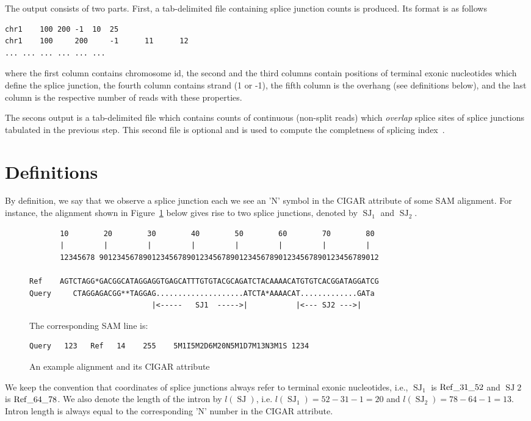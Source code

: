 \documentclass{article}
\DeclareMathOperator{\SJ}{SJ}
\begin{document}
The output consists of two parts. First, a tab-delimited file containing splice junction counts is produced.
Its format is as follows
\begin{verbatim}
chr1    100	200	-1	10	25
chr1    100     200     -1      11      12
...	...	...	...	...	...
\end{verbatim}
where the first column contains chromosome id, the second and the third columns contain positions of terminal exonic 
nucleotides which define the splice junction, the fourth column contains strand (1 or -1), the fifth column is the 
overhang (see definitions below), and the last column is the respective number of reads with these properties.

The secons output is a tab-delimited  file  which contains counts of continuous (non-split reads) which {\em overlap}
splice sites of splice junctions tabulated in the previous step. This second file is optional and is used to compute 
the completness of splicing index~\cite{pmid23172860, pmid22955974}.

\section{Definitions}

By definition, we say that we observe a splice junction each we see an 'N' symbol in the CIGAR attribute of some
SAM alignment. For instance, the alignment shown in Figure~\ref{fig::01} below gives rise to two splice junctions, 
denoted by $\SJ_1$ and $\SJ_2$.
%
\begin{figure}[h]
\footnotesize
\begin{verbatim}
       10        20        30        40        50        60        70        80
       |         |         |         |         |         |         |         |
       12345678 9012345678901234567890123456789012345678901234567890123456789012

Ref    AGTCTAGG*GACGGCATAGGAGGTGAGCATTTGTGTACGCAGATCTACAAAACATGTGTCACGGATAGGATCG
Query     CTAGGAGACGG**TAGGAG....................ATCTA*AAAACAT.............GATa
                            |<-----   SJ1  ----->|           |<--- SJ2 --->|
\end{verbatim}

The corresponding SAM line is:
\begin{verbatim}
Query   123   Ref   14    255    5M1I5M2D6M20N5M1D7M13N3M1S 1234 
\end{verbatim}
\caption{An example alignment and its CIGAR attribute\label{fig::01}}
\end{figure}
%
We keep the convention that coordinates of splice junctions always refer to terminal exonic nucleotides, 
i.e., $\SJ_1$ is $\rm Ref\_31\_52$ and $\SJ2$ is $\rm Ref\_64\_78$. We also denote the length of the 
intron by $l(\SJ)$, i.e. $l(\SJ_1)=52-31-1=20$ and $l(\SJ_2)=78-64-1=13$. Intron length is always equal 
to the corresponding 'N' number in the CIGAR attribute.
\end{document}
